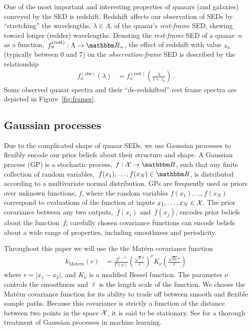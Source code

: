 \documentclass{article} %
\begin{document}
One of the most important and interesting properties of quasars (and galaxies) conveyed by the SED is redshift. 
Redshift affects our observation of SEDs by ``stretching'' the wavelengths, ${\lambda \in \Lambda}$, of the quasar's \emph{rest-frame} SED, skewing toward longer (redder) wavelengths.
Denoting the \emph{rest-frame} SED of a quasar~$n$ as a function,~${f_n^{(\text{rest})} : \Lambda \rightarrow \R_+}$, the effect of redshift with value $z_n$ (typically between 0 and 7) on the \emph{observation-frame} SED is described by the relationship 
\begin{align}
  f_n^{(\text{obs})}(\lambda) &= f_n^{(\text{rest})}\left(\frac{\lambda}{1 + z_n}\right) \, .
\end{align}
Some observed quasar spectra and their ``de-redshifted'' rest frame spectra are depicted in Figure~\ref{fig:frames}.

\subsection{Gaussian processes}
Due to the complicated shape of quasar SEDs, we use Gaussian processes to flexibly encode our prior beliefs about their structure and shape. 
A Gaussian process (GP) is a stochastic process,~${f: \mathcal{X} \rightarrow \R}$, such that any finite collection of random variables,~${f(x_1),\dots, f(x_N) \in \R}$, is distributed according to a multivariate normal distribution.  
GPs are frequently used as priors over unknown functions, $f$, where the random variables $f(x_1), \dots, f(x_N)$ correspond to evaluations of the function at inputs ${x_1, \dots, x_N \in \mathcal{X}}$.  
The prior covariance between any two outputs,~$f(x_i)$ and~$f(x_j)$, encodes prior beliefs about the function~$f$; carefully chosen covariance functions can encode beliefs about a wide range of properties, including smoothness and periodicity.  

Throughout this paper we will use the the Mat\'{e}rn \cite{Matern1986spatial} covariance function
\begin{align}
  k_{\text{Matern}}(r)
    &= \frac{2^{1-\nu}}{\Gamma(\nu)} 
       \left( \frac{\sqrt{\nu} r}{\ell} \right) ^\nu
       K_\nu\left( \frac{\sqrt{2\nu} r}{\ell}\right)
\end{align}
where ${r = |x_1 - x_2|}$, and $K_\nu$ is a modified Bessel function.  The parameter $\nu$ controls the smoothness and $\ell$ is the length scale of the function.  
We choose the Mat\'{e}rn covariance function for its ability to trade off between smooth and flexible sample paths.  
Because this covariance is strictly a function of the distance between two points in the space $\mathcal{X}$, it is said to be stationary. 
See \cite{rasmussen2006gaussian} for a thorough treatment of Gaussian processes in machine learning. 
\end{document}
